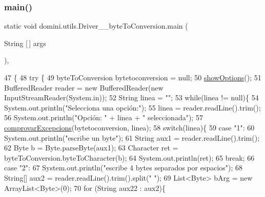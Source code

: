 \subsubsection{\texorpdfstring{main()}{main()}}
{\footnotesize\ttfamily static void domini.\+utils.\+Driver\+\_\+\+\_\+byte\+To\+Conversion.\+main (\begin{DoxyParamCaption}\item[{String \mbox{[}$\,$\mbox{]}}]{args }\end{DoxyParamCaption})\hspace{0.3cm}{\ttfamily [inline]}, {\ttfamily [static]}}


\begin{DoxyCode}
47                                            \{
48     \textcolor{keywordflow}{try} \{
49         byteToConversion bytetoconversion = null;
50         \hyperlink{classdomini_1_1utils_1_1Driver____byteToConversion_a58412c0a63cc729003ca6d28bbc3b83b}{showOptions}();
51         BufferedReader reader = \textcolor{keyword}{new} BufferedReader(\textcolor{keyword}{new} InputStreamReader(System.in));
52         String linea = \textcolor{stringliteral}{""};
53         \textcolor{keywordflow}{while}(linea != null)\{
54             System.out.println(\textcolor{stringliteral}{"Selecciona una opción:"});
55             linea = reader.readLine().trim();
56             System.out.println(\textcolor{stringliteral}{"Opción: "} + linea + \textcolor{stringliteral}{" seleccionada"});
57             \hyperlink{classdomini_1_1utils_1_1Driver____byteToConversion_a82c589da57bedb139b9254c8623a7fd4}{comprovarExcepcions}(bytetoconversion, linea);
58             \textcolor{keywordflow}{switch}(linea)\{
59                 \textcolor{keywordflow}{case} \textcolor{stringliteral}{"1"}:
60                     System.out.println(\textcolor{stringliteral}{"escribe un byte"});
61                     String aux1 = reader.readLine().trim();
62                     Byte b = Byte.parseByte(aux1);
63                     Character ret = byteToConversion.byteToCharacter(b);
64                     System.out.println(ret);
65                 \textcolor{keywordflow}{break};
66                 \textcolor{keywordflow}{case} \textcolor{stringliteral}{"2"}:
67                     System.out.println(\textcolor{stringliteral}{"escribe 4 bytes separados por espacios"});
68                     String[] aux2 = reader.readLine().trim().split(\textcolor{stringliteral}{" "});
69                     List<Byte> bArg = \textcolor{keyword}{new} ArrayList<Byte>(0);
70                     \textcolor{keywordflow}{for} (String aux22 : aux2)\{

\end{DoxyCode}
